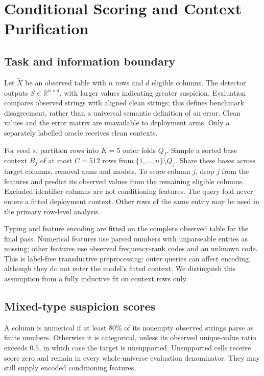 \section{Conditional Scoring and Context Purification}\label{sec:method}
\subsection{Task and information boundary}
Let $\widetilde X$ be an observed table with $n$ rows and $d$ eligible columns.
The detector outputs $S\in\mathbb R^{n\times d}$, with larger values indicating
greater suspicion. Evaluation compares observed strings with aligned clean strings;
this defines benchmark disagreement, rather than a universal semantic definition
of an error. Clean values and the error matrix are unavailable to deployment arms.
Only a separately labelled oracle receives clean contexts.

For seed $s$, partition rows into $K=5$ outer folds $Q_f$. Sample a sorted base
context $B_f$ of at most $C=512$ rows from $\{1,\ldots,n\}\setminus Q_f$.
Share these bases across target columns, removal arms and models. To score column
$j$, drop $j$ from the features and predict its observed values from the remaining
eligible columns. Excluded identifier columns are not conditioning features.
The query fold never enters a fitted deployment context. Other rows of the same
entity may be used in the primary row-level analysis.

Typing and feature encoding are fitted on the complete observed table for the
final pass. Numerical features use parsed numbers with unparseable entries as
missing; other features use observed frequency-rank codes and an unknown code.
This is label-free transductive preprocessing: outer queries can affect encoding,
although they do not enter the model's fitted context. We distinguish this
assumption from a fully inductive fit on context rows only.

\subsection{Mixed-type suspicion scores}
A column is numerical if at least $80\%$ of its nonempty observed strings parse
as finite numbers. Otherwise it is categorical, unless its observed unique-value
ratio exceeds $0.5$, in which case the target is unsupported. Unsupported cells
receive score zero and remain in every whole-universe evaluation denominator.
They may still supply encoded conditioning features.

